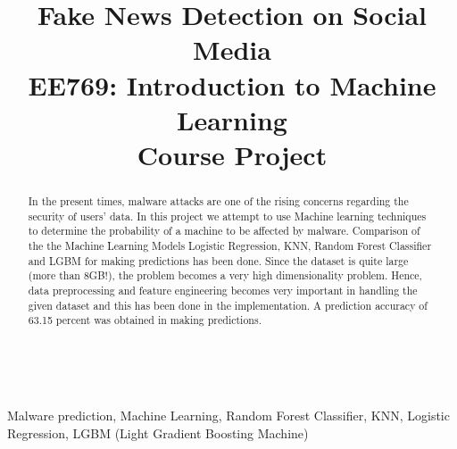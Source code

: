\documentclass[conference]{IEEEtran}
\begin{document}
\title{Fake News Detection on Social Media\\
    \large EE769: Introduction to Machine Learning\\
    Course Project
}\\
\author{
}

\maketitle

\begin{abstract}
    In the present times, malware attacks are one of the rising concerns regarding the security of users' data. In this project we attempt to use Machine learning techniques to determine the probability of a machine to be affected by malware. Comparison of the the Machine Learning Models Logistic Regression, KNN, Random Forest Classifier and LGBM for making predictions has been done. Since the dataset is quite large (more than 8GB!), the problem becomes a very high dimensionality problem. Hence, data preprocessing and feature engineering becomes very important in handling the given dataset and this has been done in the implementation. A prediction accuracy of 63.15 percent was obtained in making predictions.

\end{abstract}

\begin{IEEEkeywords}
    Malware prediction, Machine Learning, Random Forest Classifier, KNN, Logistic Regression, LGBM (Light Gradient Boosting Machine)
\end{IEEEkeywords}
\end{document}
